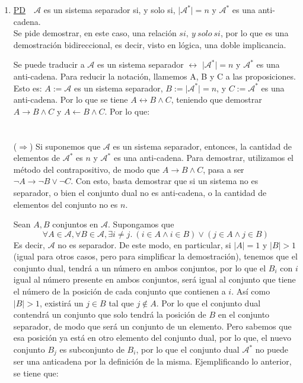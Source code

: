 \documentclass[letter]{article}
\begin{document}
\begin{pregunta}{2}
\begin{enumerate}
		\item
			\underline{PD}\ \ $\mathcal{A}$ es un sistema separador si, y solo si, $\vert\mathcal{A}^*\vert = n$ y $\mathcal{A}^*$ es una anti-cadena.\\
			
			Se pide demostrar, en este caso, una relación $si,\ y\ solo\ si$, por lo que es una demostración bidireccional, es decir, visto en lógica, una doble implicancia.
			
			Se puede traducir a $\mathcal{A}$ es un sistema separador $\leftrightarrow$ $\vert\mathcal{A}^*\vert = n$ y $\mathcal{A}^*$ es una anti-cadena. Para reducir la notación, llamemos A, B y C a las proposiciones. Esto es: $A:=\mathcal{A}$ es un sistema separador, $B:=\vert\mathcal{A}^*\vert = n$, y $C:=\mathcal{A}^*$ es una anti-cadena. Por lo que se tiene $A \leftrightarrow B \wedge C$, teniendo que demostrar $A \rightarrow B \wedge C$ y $A \leftarrow B \wedge C$. Por lo que:\\ \\ \\
			
			($\Rightarrow$) Si suponemos que $\mathcal{A}$ es un sistema separador, entonces, la cantidad de elementos de $\mathcal{A}^*$ es $n$ y $\mathcal{A}^*$ es una anti-cadena. Para demostrar, utilizamos el método del contrapositivo, de modo que $A \rightarrow B \wedge C$, pasa a ser $\neg A \rightarrow \neg B \vee \neg C$. Con esto, basta demostrar que si un sistema no es separador, o bien el conjunto dual no es anti-cadena, o la cantidad de elementos del conjunto no es $n$.
			
			Sean $A, B$ conjuntos en $\mathcal{A}$. Supongamos que $$\forall A \in \mathcal{A}, \forall B \in \mathcal{A}, \exists i\neq j.\ (i \in A \wedge i \in B) \vee (j \in A \wedge j \in B)$$ 
			Es decir, $\mathcal{A}$ no es separador. De este modo, en particular, si $\vert A \vert = 1$ y $\vert B \vert > 1$ (igual para otros casos, pero para simplificar la demostración), tenemos que el conjunto dual, tendrá a un número en ambos conjuntos, por lo que el $B_i$ con $i$ igual al número presente en ambos conjuntos, será igual al conjunto que tiene el número de la posición de cada conjunto que contienen a $i$. Así como $\vert B \vert > 1$, existirá un $j \in B$ tal que $j \notin A$. Por lo que el conjunto dual contendrá un conjunto que solo tendrá la posición de $B$ en el conjunto separador, de modo que será un conjunto de un elemento. Pero sabemos que esa posición ya está en otro elemento del conjunto dual, por lo que, el nuevo conjunto $B_j$ es subconjunto de $B_i$, por lo que el conjunto dual $\mathcal{A}^*$ no puede ser una anticadena por la definición de la misma. Ejemplificando lo anterior, se tiene que:
			

\end{enumerate}
\end{pregunta}
\end{document}
